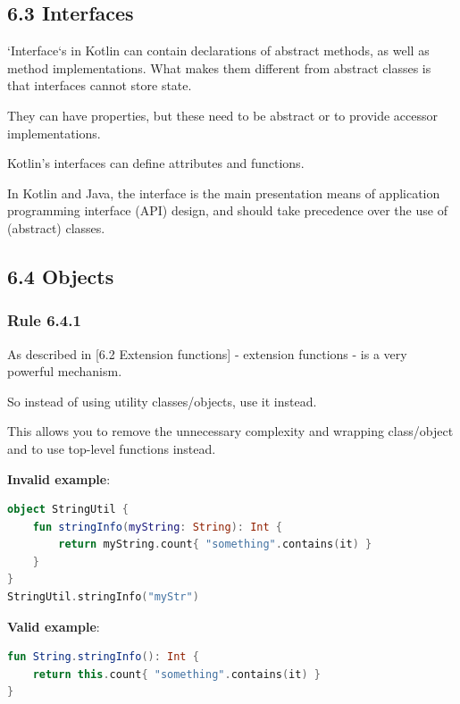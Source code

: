 {{{{\subsection*{\textbf{6.3 Interfaces}}

`Interface`s in Kotlin can contain declarations of abstract methods, as well as method implementations. What makes them different from abstract classes is that interfaces cannot store state.

They can have properties, but these need to be abstract or to provide accessor implementations.



Kotlin's interfaces can define attributes and functions.

In Kotlin and Java, the interface is the main presentation means of application programming interface (API) design, and should take precedence over the use of (abstract) classes.



\subsection*{\textbf{6.4 Objects}}

\subsubsection*{\textbf{Rule 6.4.1}}
\leavevmode\newline

As described in [6.2 Extension functions] - extension functions - is a very powerful mechanism.

So instead of using utility classes/objects, use it instead.

This allows you to remove the unnecessary complexity and wrapping class/object and to use top-level functions instead.



\textbf{Invalid example}:

\begin{lstlisting}[language=Kotlin]
object StringUtil {
    fun stringInfo(myString: String): Int {
        return myString.count{ "something".contains(it) }
    }
}
StringUtil.stringInfo("myStr")
\end{lstlisting}


\textbf{Valid example}:

\begin{lstlisting}[language=Kotlin]
fun String.stringInfo(): Int {
    return this.count{ "something".contains(it) }
}


\end{lstlisting}}}}}
